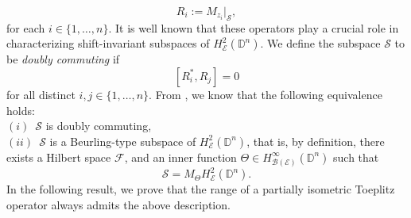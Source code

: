 \documentclass[12pt]{amsart}
\theoremstyle{definition}
\newcommand{\D}{\mathbb{D}}
\newcommand{\1}{{\mbox{\bf 1}}}
\newcommand{\clb}{\mathcal{B}}
\newcommand{\cle}{\mathcal{E}}
\newcommand{\clf}{\mathcal{F}}
\newcommand{\cls}{\mathcal{S}}
\begin{document}
\[
R_i := M_{z_i}|_{\cls},
\]
for each $i \in \{1,\ldots,n\}$. It is well known that these operators play a crucial role in characterizing shift-invariant subspaces of $H_{\cle}^2(\D^n)$.  We define the subspace $\cls$ to be \textit{doubly commuting} if 
\[
[R_i^*,R_j] = 0
\]
for all distinct $i,j \in \{1,\ldots,n\}$. From \cite{SSW}, we know that the following equivalence holds:\\
$(i)$~$\cls$ is doubly commuting,\\
$(ii)$~$\cls$ is a Beurling-type subspace of $H_{\cle}^2(\D^n)$, that is, by definition, there exists a Hilbert space $\clf$, and an inner function $\Theta \in H_{\clb(\cle)}^{\infty}(\D^n)$ such that
\[
\cls = M_{\Theta} H_{\cle}^2(\D^n).
\]
In the following result, we prove that the range of a partially isometric Toeplitz operator always admits the above description.
\end{document}
